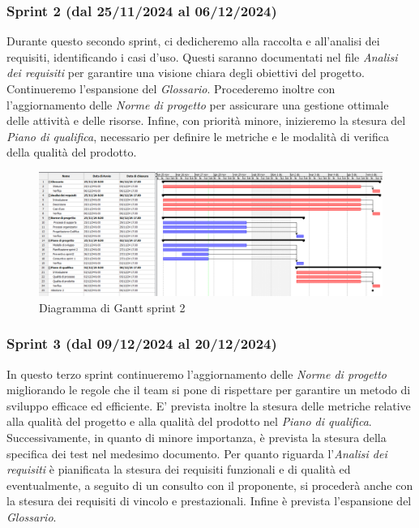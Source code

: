         \subsubsection{Sprint 2 (dal 25/11/2024 al 06/12/2024)}
        Durante questo secondo sprint, ci dedicheremo alla raccolta e all'analisi dei requisiti, identificando i 
        casi d'uso. Questi saranno documentati nel file \textit{Analisi dei requisiti} per garantire una visione 
        chiara degli obiettivi del progetto. Continueremo l'espansione del \textit{Glossario}. Procederemo inoltre con l'aggiornamento delle \textit{Norme di progetto} per assicurare una gestione ottimale delle attività e delle risorse. 
        Infine, con priorità minore, inizieremo la stesura del \textit{Piano di qualifica}, necessario per definire le metriche e le modalità di 
        verifica della qualità del prodotto.

        
        \begin{figure}[h!]
            \centering
            \includegraphics[scale = 0.3]{template/images/gantt2.png}
            \caption{Diagramma di Gantt sprint 2}
            \label{fig:3.2} %
        \end{figure}


        \subsubsection{Sprint 3 (dal 09/12/2024 al 20/12/2024)}
        In questo terzo sprint continueremo l'aggiornamento delle \textit{Norme di progetto} migliorando le regole che il team si pone di rispettare per garantire un metodo di sviluppo efficace ed efficiente. 
        E' prevista inoltre la stesura delle metriche relative alla qualità del progetto e alla qualità del prodotto nel \textit{Piano di qualifica}.
        Successivamente, in quanto di minore importanza, è prevista la stesura della specifica dei test nel medesimo documento.
        Per quanto riguarda l'\textit{Analisi dei requisiti} è pianificata la stesura dei requisiti funzionali e di qualità ed eventualmente, a seguito di un consulto con il proponente, si procederà anche con la stesura dei requisiti di vincolo e prestazionali.
        Infine è prevista l'espansione del \textit{Glossario}.

